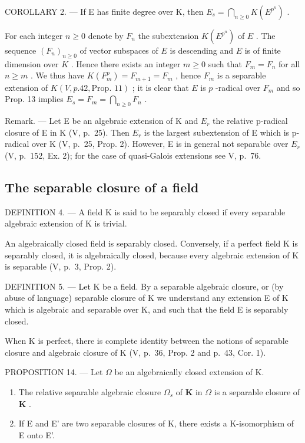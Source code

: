 COROLLARY 2. --- If E has finite degree over K, then \(E_{s} = \bigcap_{n \geqslant 0} K(E^{p^{n}})\) .

For each integer \(n \geqslant 0\) denote by \(F_n\) the subextension \(K(E^{p^n})\) of \(E\) . The sequence \((F_n)_{n \geqslant 0}\) of vector subspaces of \(E\) is descending and \(E\) is of finite dimension over \(K\) . Hence there exists an integer \(m \geqslant 0\) such that \(F_m = F_n\) for all \(n \geqslant m\) . We thus have \(K(F_m^p) = F_{m+1} = F_m\) , hence \(F_m\) is a separable extension of \(K(V, p. 42, \text{Prop. } 11)\) ; it is clear that \(E\) is \(p\) -radical over \(F_m\) and so Prop. 13 implies \(E_s = F_m = \bigcap_{n \geqslant 0} F_n\) .

Remark. --- Let E be an algebraic extension of K and \(E_{r}\) the relative p-radical closure of E in K (V, p.~25). Then \(E_{r}\) is the largest subextension of E which is p-radical over K (V, p.~25, Prop. 2). However, E is in general not separable over \(E_{r}\) (V, p.~152, Ex. 2); for the case of quasi-Galois extensions see V, p.~76.

\subsection{The separable closure of a field}

DEFINITION 4. --- A field K is said to be separably closed if every separable algebraic extension of K is trivial.

An algebraically closed field is separably closed. Conversely, if a perfect field K is separably closed, it is algebraically closed, because every algebraic extension of K is separable (V, p.~3, Prop. 2).

DEFINITION 5. --- Let K be a field. By a separable algebraic closure, or (by abuse of language) separable closure of K we understand any extension E of K which is algebraic and separable over K, and such that the field E is separably closed.

When K is perfect, there is complete identity between the notions of separable closure and algebraic closure of K (V, p.~36, Prop. 2 and p.~43, Cor. 1).

PROPOSITION 14. --- Let \(\Omega\) be an algebraically closed extension of K.

\begin{enumerate}
\def\labelenumi{\alph{enumi})}
\item
  The relative separable algebraic closure \(\Omega_s\) of \(\mathbf{K}\) in \(\Omega\) is a separable closure of \(\mathbf{K}\) .
\item
  If E and E' are two separable closures of K, there exists a K-isomorphism of E onto E'.
\end{enumerate}

